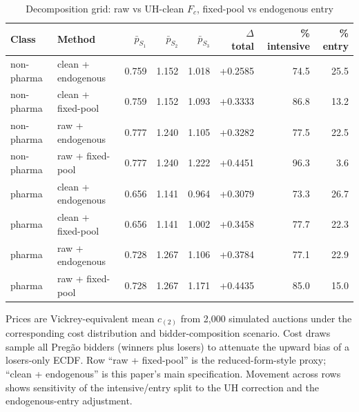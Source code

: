 \begin{table}[htbp]
\centering
\begin{threeparttable}
\caption{Decomposition grid: raw vs UH-clean $F_c$, fixed-pool vs endogenous entry}
\label{tab:v3_decomp_grid}
\small
\setlength{\tabcolsep}{4pt}
\begin{tabular}{llrrrrrr}
\toprule
Class & Method & $\bar p_{S_1}$ & $\bar p_{S_2}$ & $\bar p_{S_3}$ & $\Delta$ total & \% intensive & \% entry \\
\midrule
non-pharma & clean + endogenous & 0.759 & 1.152 & 1.018 & +0.2585 & 74.5 & 25.5 \\
non-pharma & clean + fixed-pool & 0.759 & 1.152 & 1.093 & +0.3333 & 86.8 & 13.2 \\
non-pharma & raw + endogenous & 0.777 & 1.240 & 1.105 & +0.3282 & 77.5 & 22.5 \\
non-pharma & raw + fixed-pool & 0.777 & 1.240 & 1.222 & +0.4451 & 96.3 & 3.6 \\
pharma & clean + endogenous & 0.656 & 1.141 & 0.964 & +0.3079 & 73.3 & 26.7 \\
pharma & clean + fixed-pool & 0.656 & 1.141 & 1.002 & +0.3458 & 77.7 & 22.3 \\
pharma & raw + endogenous & 0.728 & 1.267 & 1.106 & +0.3784 & 77.1 & 22.9 \\
pharma & raw + fixed-pool & 0.728 & 1.267 & 1.171 & +0.4435 & 85.0 & 15.0 \\
\bottomrule
\end{tabular}
\begin{tablenotes}\footnotesize
\item Prices are Vickrey-equivalent mean $c_{(2)}$ from 2{,}000
simulated auctions under the corresponding cost distribution and
bidder-composition scenario. Cost draws sample all Preg\~ao
bidders (winners plus losers) to attenuate the upward bias of a
losers-only ECDF. Row ``raw + fixed-pool'' is the reduced-form-style
proxy; ``clean + endogenous'' is this paper's main specification.
Movement across rows shows sensitivity of the intensive/entry
split to the UH correction and the endogenous-entry adjustment.
\end{tablenotes}
\end{threeparttable}
\end{table}
